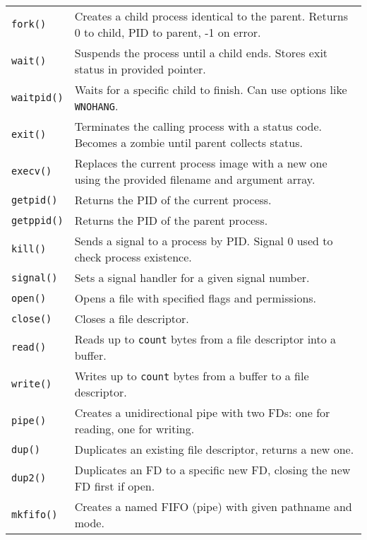 \documentclass[openany,12pt]{book}
\newcommand{\code}[1]{\texttt{#1}}
\begin{document}
\begin{longtable}{|>{\raggedright\arraybackslash}p{3cm}|>{\raggedright\arraybackslash}p{12cm}|}
  \hline
  \code{fork()}     & Creates a child process identical to the parent. Returns 0 to child, PID to parent, -1 on error.  \\
  \code{wait()}     & Suspends the process until a child ends. Stores exit status in provided pointer.                  \\
  \code{waitpid()}  & Waits for a specific child to finish. Can use options like \code{WNOHANG}.                        \\
  \code{exit()}     & Terminates the calling process with a status code. Becomes a zombie until parent collects status. \\
  \code{execv()}    & Replaces the current process image with a new one using the provided filename and argument array. \\
  \code{getpid()}   & Returns the PID of the current process.                                                           \\
  \code{getppid()}  & Returns the PID of the parent process.                                                            \\
  \code{kill()}     & Sends a signal to a process by PID. Signal 0 used to check process existence.                     \\
  \code{signal()}   & Sets a signal handler for a given signal number.                                                  \\
  \code{open()}     & Opens a file with specified flags and permissions.                                                \\
  \code{close()}    & Closes a file descriptor.                                                                         \\
  \code{read()}     & Reads up to \code{count} bytes from a file descriptor into a buffer.                              \\
  \code{write()}    & Writes up to \code{count} bytes from a buffer to a file descriptor.                               \\
  \code{pipe()}     & Creates a unidirectional pipe with two FDs: one for reading, one for writing.                     \\
  \code{dup()}      & Duplicates an existing file descriptor, returns a new one.                                        \\
  \code{dup2()}     & Duplicates an FD to a specific new FD, closing the new FD first if open.                          \\
  \code{mkfifo()}   & Creates a named FIFO (pipe) with given pathname and mode.                                         \\
  \hline
\end{longtable}
\end{document}
